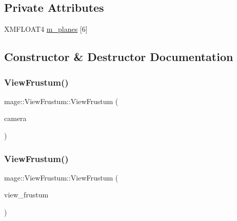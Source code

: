 \subsection*{Private Attributes}
\begin{DoxyCompactItemize}
\item 
X\+M\+F\+L\+O\+A\+T4 \hyperlink{classmage_1_1_view_frustum_aa5d8b90bfc005bd19566983401ccd511}{m\+\_\+planes} \mbox{[}6\mbox{]}
\end{DoxyCompactItemize}


\subsection{Constructor \& Destructor Documentation}
\hypertarget{classmage_1_1_view_frustum_ad1fd4a59f6cd0fd38289e66d4c6b5d51}{}\label{classmage_1_1_view_frustum_ad1fd4a59f6cd0fd38289e66d4c6b5d51} 
\subsubsection{\texorpdfstring{View\+Frustum()}{ViewFrustum()}\hspace{0.1cm}{\footnotesize\ttfamily [1/3]}}
{\footnotesize\ttfamily mage\+::\+View\+Frustum\+::\+View\+Frustum (\begin{DoxyParamCaption}\item[{const \hyperlink{classmage_1_1_camera}{Camera} \&}]{camera }\end{DoxyParamCaption})}

\hypertarget{classmage_1_1_view_frustum_abbd4ec6c2766d3f630bce16cefa8bc4d}{}\label{classmage_1_1_view_frustum_abbd4ec6c2766d3f630bce16cefa8bc4d} 
\subsubsection{\texorpdfstring{View\+Frustum()}{ViewFrustum()}\hspace{0.1cm}{\footnotesize\ttfamily [2/3]}}
{\footnotesize\ttfamily mage\+::\+View\+Frustum\+::\+View\+Frustum (\begin{DoxyParamCaption}\item[{const \hyperlink{classmage_1_1_view_frustum}{View\+Frustum} \&}]{view\+\_\+frustum }\end{DoxyParamCaption})\hspace{0.3cm}{\ttfamily [default]}}

